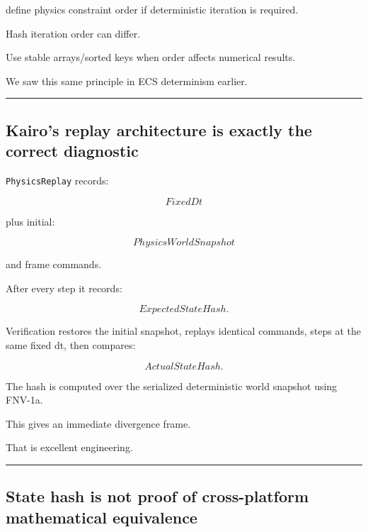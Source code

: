 define physics constraint order if deterministic iteration is required.

Hash iteration order can differ.

Use stable arrays/sorted keys when order affects numerical results.

We saw this same principle in ECS determinism earlier.

\begin{center}\rule{0.5\linewidth}{0.5pt}\end{center}

\subsection{Kairo's replay architecture is exactly the correct diagnostic}\label{06-engine-ii-ch039-kairos-replay-architecture-is-exactly-the-correct-diagnostic}

\hypertarget{06-engine-ii-ch039-kairos-replay-architecture-is-exactly-the-correct-diagnostic}{}

\texttt{PhysicsReplay} records:

\[
FixedDt
\]

plus initial:

\[
PhysicsWorldSnapshot
\]

and frame commands.

After every step it records:

\[
ExpectedStateHash.
\]

Verification restores the initial snapshot, replays identical commands, steps at the same fixed dt, then compares:

\[
ActualStateHash.
\]

The hash is computed over the serialized deterministic world snapshot using FNV-1a.

This gives an immediate divergence frame.

That is excellent engineering.

\begin{center}\rule{0.5\linewidth}{0.5pt}\end{center}

\subsection{State hash is not proof of cross-platform mathematical equivalence}\label{06-engine-ii-ch039-state-hash-is-not-proof-of-cross-platform-mathematical-equivalence}

\hypertarget{06-engine-ii-ch039-state-hash-is-not-proof-of-cross-platform-mathematical-equivalence}{}

